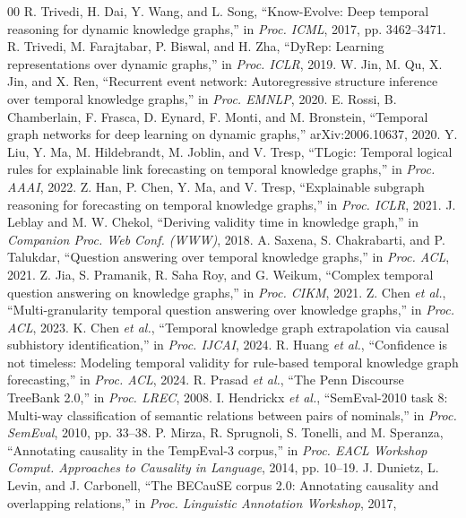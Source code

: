 \documentclass[conference]{IEEEtran}
\begin{document}
\begin{thebibliography}{00}
 R. Trivedi, H. Dai, Y. Wang, and L. Song, ``Know-Evolve: Deep temporal reasoning
for dynamic knowledge graphs,'' in \textit{Proc. ICML}, 2017, pp. 3462--3471.
 R. Trivedi, M. Farajtabar, P. Biswal, and H. Zha, ``DyRep: Learning representations
over dynamic graphs,'' in \textit{Proc. ICLR}, 2019.
 W. Jin, M. Qu, X. Jin, and X. Ren, ``Recurrent event network: Autoregressive
structure inference over temporal knowledge graphs,'' in \textit{Proc. EMNLP}, 2020.
 E. Rossi, B. Chamberlain, F. Frasca, D. Eynard, F. Monti, and M. Bronstein, ``Temporal
graph networks for deep learning on dynamic graphs,'' arXiv:2006.10637, 2020.
 Y. Liu, Y. Ma, M. Hildebrandt, M. Joblin, and V. Tresp, ``TLogic: Temporal logical
rules for explainable link forecasting on temporal knowledge graphs,'' in \textit{Proc. AAAI}, 2022.
 Z. Han, P. Chen, Y. Ma, and V. Tresp, ``Explainable subgraph reasoning for
forecasting on temporal knowledge graphs,'' in \textit{Proc. ICLR}, 2021.
 J. Leblay and M. W. Chekol, ``Deriving validity time in knowledge graph,'' in
\textit{Companion Proc. Web Conf. (WWW)}, 2018.
 A. Saxena, S. Chakrabarti, and P. Talukdar, ``Question answering over temporal
knowledge graphs,'' in \textit{Proc. ACL}, 2021.
 Z. Jia, S. Pramanik, R. Saha Roy, and G. Weikum, ``Complex temporal question
answering on knowledge graphs,'' in \textit{Proc. CIKM}, 2021.
 Z. Chen \textit{et al.}, ``Multi-granularity temporal question answering over
knowledge graphs,'' in \textit{Proc. ACL}, 2023.
 K. Chen \textit{et al.}, ``Temporal knowledge graph extrapolation via causal subhistory
identification,'' in \textit{Proc. IJCAI}, 2024.
 R. Huang \textit{et al.}, ``Confidence is not timeless: Modeling temporal validity
for rule-based temporal knowledge graph forecasting,'' in \textit{Proc. ACL}, 2024.
 R. Prasad \textit{et al.}, ``The Penn Discourse TreeBank 2.0,'' in \textit{Proc.
LREC}, 2008.
 I. Hendrickx \textit{et al.}, ``SemEval-2010 task 8: Multi-way classification of
semantic relations between pairs of nominals,'' in \textit{Proc. SemEval}, 2010, pp. 33--38.
 P. Mirza, R. Sprugnoli, S. Tonelli, and M. Speranza, ``Annotating causality in the
TempEval-3 corpus,'' in \textit{Proc. EACL Workshop Comput. Approaches to Causality in Language},
2014, pp. 10--19.
 J. Dunietz, L. Levin, and J. Carbonell, ``The BECauSE corpus 2.0: Annotating
causality and overlapping relations,'' in \textit{Proc. Linguistic Annotation Workshop}, 2017,

\end{thebibliography}
\end{document}
